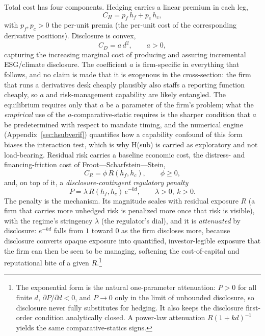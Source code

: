 \documentclass[11pt,a4paper]{article}
\begin{document}
Total cost has four components. Hedging carries a linear premium in each leg,
\begin{equation}
C_H=p_f\,h_f+p_c\,h_c,
\end{equation}
with $p_f,p_c>0$ the per-unit premia (the per-unit cost of the corresponding derivative positions). Disclosure is convex,
\begin{equation}
C_D=a\,d^2,\qquad a>0,
\end{equation}
capturing the increasing marginal cost of producing and assuring incremental ESG/climate disclosure. The coefficient $a$ is firm-specific in everything that follows, and no claim is made that it is exogenous in the cross-section: the firm that runs a derivatives desk cheaply plausibly also staffs a reporting function cheaply, so $a$ and risk-management capability are likely entangled. The equilibrium requires only that $a$ be a parameter of the firm's problem; what the \emph{empirical} use of the $a$-comparative-static requires is the sharper condition that $a$ be predetermined with respect to mandate timing, and the numerical engine (Appendix~\ref{sec:hsubverif}) quantifies how a capability confound of this form biases the interaction test, which is why H(sub) is carried as exploratory and not load-bearing. Residual risk carries a baseline economic cost, the distress- and financing-friction cost of Froot---Scharfstein---Stein,
\begin{equation}
C_R=\phi\,R(h_f,h_c),\qquad \phi\ge 0,
\end{equation}
and, on top of it, a \emph{disclosure-contingent regulatory penalty}
\begin{equation}
P=\lambda\,R(h_f,h_c)\,e^{-kd},\qquad \lambda>0,\ k>0.
\label{eq:penalty}
\end{equation}
The penalty is the mechanism. Its magnitude scales with residual exposure $R$ (a firm that carries more unhedged risk is penalized more once that risk is visible), with the regime's stringency $\lambda$ (the regulator's dial), and it is \emph{attenuated} by disclosure: $e^{-kd}$ falls from $1$ toward $0$ as the firm discloses more, because disclosure converts opaque exposure into quantified, investor-legible exposure that the firm can then be seen to be managing, softening the cost-of-capital and reputational bite of a given $R$.\footnote{The exponential form is the natural one-parameter attenuation: $P>0$ for all finite $d$, $\partial P/\partial d<0$, and $P\to 0$ only in the limit of unbounded disclosure, so disclosure never fully substitutes for hedging. It also keeps the disclosure first-order condition analytically closed. A power-law attenuation $R(1+kd)^{-1}$ yields the same comparative-statics signs.}
\end{document}
